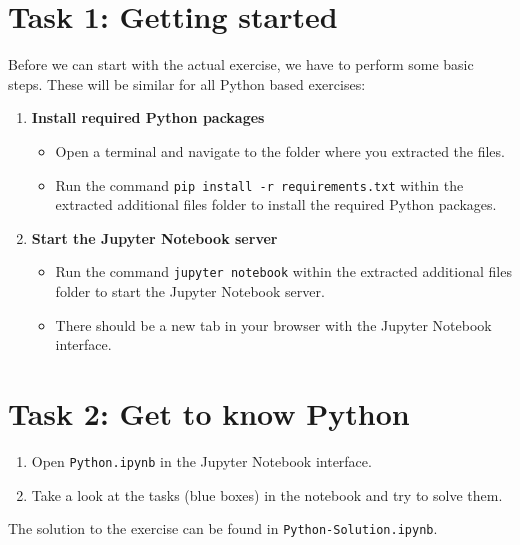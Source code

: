 \documentclass[
english,
smallborders
]{i6prcsht}
\begin{document}
\section*{Task 1: Getting started}

Before we can start with the actual exercise, we have to perform some basic steps. These will be similar for all Python based exercises:

\begin{enumerate}
	\item \textbf{Install required Python packages}

	      \begin{itemize}
		      \item Open a terminal and navigate to the folder where you extracted the files.
		      \item Run the command \texttt{pip install -r requirements.txt} within the extracted additional files
		            folder to install the required Python packages.
	      \end{itemize}

	\item \textbf{Start the Jupyter Notebook server}

	      \begin{itemize}
		      \item Run the command \texttt{jupyter notebook} within the extracted additional files
		            folder to start the Jupyter Notebook server.
		      \item There should be a new tab in your browser with the Jupyter Notebook interface.
	      \end{itemize}
\end{enumerate}

\section*{Task 2: Get to know Python}

\begin{enumerate}
	\item Open \texttt{Python.ipynb} in the Jupyter Notebook interface.
	\item Take a look at the tasks (blue boxes) in the notebook and try to solve them.
\end{enumerate}

\begin{solution}
	The solution to the exercise can be found in \texttt{Python-Solution.ipynb}.
\end{solution}
\end{document}
